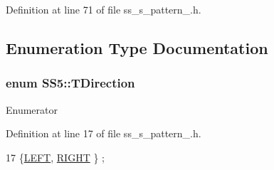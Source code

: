 Definition at line 71 of file ss\+\_\+s\+\_\+pattern\+\_.\+h.



\subsection{Enumeration Type Documentation}
\subsubsection[{\texorpdfstring{T\+Direction}{TDirection}}]{\setlength{\rightskip}{0pt plus 5cm}enum {\bf S\+S5\+::\+T\+Direction}\hspace{0.3cm}{\ttfamily [strong]}}\hypertarget{namespaceSS5_a567f4bfbe784969d523c1fa15e2cf713}{}\label{namespaceSS5_a567f4bfbe784969d523c1fa15e2cf713}
\begin{Desc}
\item[Enumerator]\par
\begin{description}
\item[{\em 
L\+E\+FT\hypertarget{namespaceSS5_a567f4bfbe784969d523c1fa15e2cf713a684d325a7303f52e64011467ff5c5758}{}\label{namespaceSS5_a567f4bfbe784969d523c1fa15e2cf713a684d325a7303f52e64011467ff5c5758}
}]\item[{\em 
R\+I\+G\+HT\hypertarget{namespaceSS5_a567f4bfbe784969d523c1fa15e2cf713a21507b40c80068eda19865706fdc2403}{}\label{namespaceSS5_a567f4bfbe784969d523c1fa15e2cf713a21507b40c80068eda19865706fdc2403}
}]\end{description}
\end{Desc}


Definition at line 17 of file ss\+\_\+s\+\_\+pattern\+\_.\+h.


\begin{DoxyCode}
17 \{\hyperlink{namespaceSS4_ac7fa695c4f9dc0b99e73fcbbf5311282a684d325a7303f52e64011467ff5c5758}{LEFT}, \hyperlink{namespaceSS4_ac7fa695c4f9dc0b99e73fcbbf5311282a21507b40c80068eda19865706fdc2403}{RIGHT} \} ;
\end{DoxyCode}
